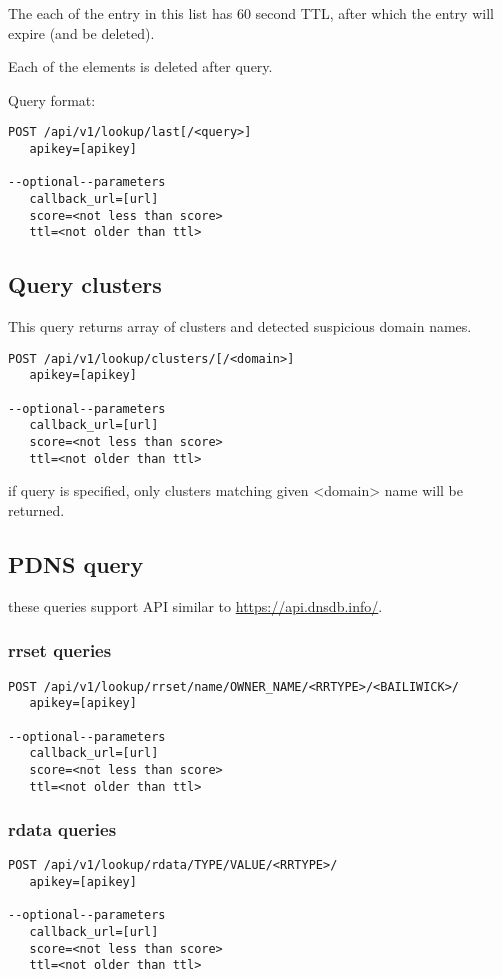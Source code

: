 \documentclass[a4paper]{article}
\begin{document}
The each of the entry in this list has 60 second TTL, after which the
entry will expire (and be deleted).

Each of the elements is deleted after query.

Query format:
\lstset{language=HTML,label= ,caption= ,numbers=none}
\begin{lstlisting}
POST /api/v1/lookup/last[/<query>]
   apikey=[apikey]

--optional--parameters
   callback_url=[url]
   score=<not less than score>
   ttl=<not older than ttl>
\end{lstlisting}


\subsection{Query clusters}
\label{sec-4-2}
This query returns array of clusters and detected suspicious domain
names.
\lstset{language=HTML,label= ,caption= ,numbers=none}
\begin{lstlisting}
POST /api/v1/lookup/clusters/[/<domain>]
   apikey=[apikey]

--optional--parameters
   callback_url=[url]
   score=<not less than score>
   ttl=<not older than ttl>
\end{lstlisting}

if query is specified, only clusters matching given <domain> name will
be returned.

\subsection{PDNS query}
\label{sec-4-3}
these queries support API similar to \url{https://api.dnsdb.info/}.

\subsubsection{rrset queries}
\label{sec-4-3-1}
\lstset{language=HTML,label= ,caption= ,numbers=none}
\begin{lstlisting}
POST /api/v1/lookup/rrset/name/OWNER_NAME/<RRTYPE>/<BAILIWICK>/
   apikey=[apikey]

--optional--parameters
   callback_url=[url]
   score=<not less than score>
   ttl=<not older than ttl>
\end{lstlisting}

\subsubsection{rdata queries}
\label{sec-4-3-2}
\lstset{language=HTML,label= ,caption= ,numbers=none}
\begin{lstlisting}
POST /api/v1/lookup/rdata/TYPE/VALUE/<RRTYPE>/
   apikey=[apikey]

--optional--parameters
   callback_url=[url]
   score=<not less than score>
   ttl=<not older than ttl>
\end{lstlisting}
\end{document}
